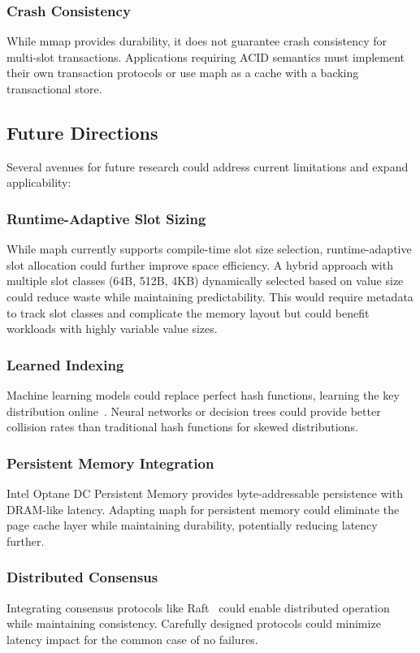 \documentclass[10pt,conference]{IEEEtran}
\begin{document}
\subsubsection{Crash Consistency}
While mmap provides durability, it does not guarantee crash consistency for multi-slot transactions. Applications requiring ACID semantics must implement their own transaction protocols or use maph as a cache with a backing transactional store.

\subsection{Future Directions}

Several avenues for future research could address current limitations and expand applicability:

\subsubsection{Runtime-Adaptive Slot Sizing}
While maph currently supports compile-time slot size selection, runtime-adaptive slot allocation could further improve space efficiency. A hybrid approach with multiple slot classes (64B, 512B, 4KB) dynamically selected based on value size could reduce waste while maintaining predictability. This would require metadata to track slot classes and complicate the memory layout but could benefit workloads with highly variable value sizes.

\subsubsection{Learned Indexing}
Machine learning models could replace perfect hash functions, learning the key distribution online~\cite{learned-index}. Neural networks or decision trees could provide better collision rates than traditional hash functions for skewed distributions.

\subsubsection{Persistent Memory Integration}
Intel Optane DC Persistent Memory provides byte-addressable persistence with DRAM-like latency. Adapting maph for persistent memory could eliminate the page cache layer while maintaining durability, potentially reducing latency further.

\subsubsection{Distributed Consensus}
Integrating consensus protocols like Raft~\cite{raft} could enable distributed operation while maintaining consistency. Carefully designed protocols could minimize latency impact for the common case of no failures.
\end{document}
